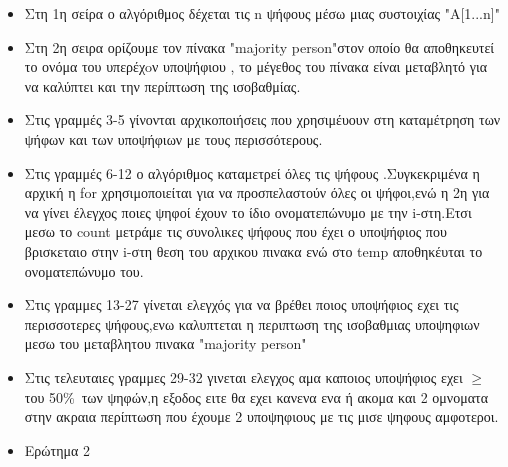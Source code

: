 \documentclass[a4paper]{article}
\begin{document}
\begin{itemize}
    \item Στη 1η σείρα ο αλγόριθμος δέχεται τις n ψήφους μέσω μιας συστοιχίας "A[1...n]"
\end{itemize}
\begin{itemize}
    \item Στη 2η σειρα ορίζουμε τον πίνακα "majority person"στον οποίο θα αποθηκευτεί  το ονόμα του υπερέχoν υποψήφιου , το μέγεθος του πίνακα είναι μεταβλητό για να καλύπτει και την περίπτωση της ισοβαθμίας.
\end{itemize}
\begin{itemize}
    \item Στις γραμμές 3-5 γίνονται αρχικοποιήσεις που χρησιμέυουν στη καταμέτρηση των ψήφων και των υποψήφιων με τους περισσότερους.
\end{itemize}
\begin{itemize}
    \item Στις γραμμές 6-12 ο αλγόριθμος καταμετρεί όλες τις ψήφους .Συγκεκριμένα η αρχική η for χρησιμοποιείται για να προσπελαστούν όλες οι ψήφοι,ενώ η 2η για να γίνει έλεγχος ποιες ψηφοί έχουν το ίδιο ονοματεπώνυμο με την i-στη.Ετσι μεσω το count μετράμε τις συνολικες ψήφους που έχει ο υποψήφιος που βρισκεταιο στην i-στη θεση του αρχικου πινακα ενώ στο temp αποθηκέυται το ονοματεπώνυμο του.     
\end{itemize}
\begin{itemize}
    \item Στις γραμμες 13-27 γίνεται  ελεγχός για να βρέθει  ποιος υποψήφιος εχει τις περισσοτερες ψήφους,ενω καλυπτεται η περιπτωση της ισοβαθμιας υποψηφιων μεσω του μεταβλητου πινακα "majority person"
\end{itemize}
\begin{itemize}
    \item Στις τελευταιες γραμμες 29-32 γινεται ελεγχος αμα καποιος υποψήφιος εχει $\geq$ του 50\%\ των ψηφών,η εξοδος ειτε θα εχει κανενα ενα ή ακομα και 2 ομνοματα στην ακραια περίπτωση που έχουμε 2 υποψηφιους με τις μισε ψηφους αμφοτεροι.
\end{itemize}

\begin{itemize}
\item Ερώτημα 2
\end{itemize}

\lstset{frame=none}
\end{document}
